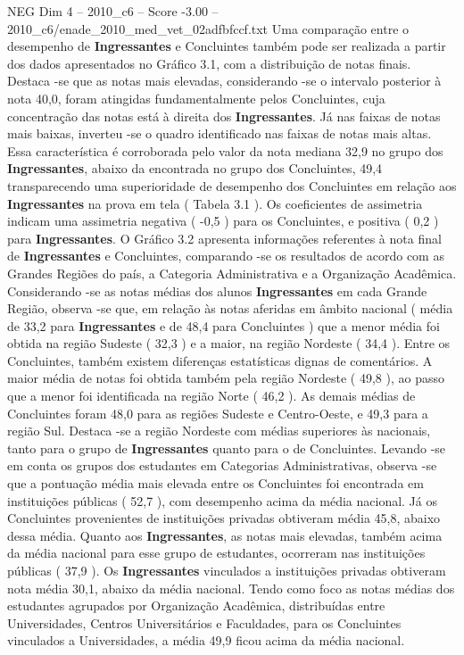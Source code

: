 \begin{textsample}{NEG Dim 4 – 2010\_c6 – Score -3.00 – 2010\_c6/enade\_2010\_med\_vet\_02adfbfccf.txt}
Uma comparação entre o desempenho de \textbf{Ingressantes} e Concluintes também pode ser realizada a partir dos dados apresentados no Gráfico 3.1, com a distribuição de notas finais.
Destaca -se que as notas mais elevadas, considerando -se o intervalo posterior à nota 40,0, foram atingidas fundamentalmente pelos Concluintes, cuja concentração das notas está à direita dos \textbf{Ingressantes}.
Já nas faixas de notas mais baixas, inverteu -se o quadro identificado nas faixas de notas mais altas.
Essa característica é corroborada pelo valor da nota mediana 32,9 no grupo dos \textbf{Ingressantes}, abaixo da encontrada no grupo dos Concluintes, 49,4 transparecendo uma superioridade de desempenho dos Concluintes em relação aos \textbf{Ingressantes} na prova em tela ( Tabela 3.1 ).
Os coeficientes de assimetria indicam uma assimetria negativa ( -0,5 ) para os Concluintes, e positiva ( 0,2 ) para \textbf{Ingressantes}.
O Gráfico 3.2 apresenta informações referentes à nota final de \textbf{Ingressantes} e Concluintes, comparando -se os resultados de acordo com as Grandes Regiões do país, a Categoria Administrativa e a Organização Acadêmica.
Considerando -se as notas médias dos alunos \textbf{Ingressantes} em cada Grande Região, observa -se que, em relação às notas aferidas em âmbito nacional ( média de 33,2 para \textbf{Ingressantes} e de 48,4 para Concluintes ) que a menor média foi obtida na região Sudeste ( 32,3 ) e a maior, na região Nordeste ( 34,4 ).
Entre os Concluintes, também existem diferenças estatísticas dignas de comentários.
A maior média de notas foi obtida também pela região Nordeste ( 49,8 ), ao passo que a menor foi identificada na região Norte ( 46,2 ).
As demais médias de Concluintes foram 48,0 para as regiões Sudeste e Centro-Oeste, e 49,3 para a região Sul.
Destaca -se a região Nordeste com médias superiores às nacionais, tanto para o grupo de \textbf{Ingressantes} quanto para o de Concluintes.
Levando -se em conta os grupos dos estudantes em Categorias Administrativas, observa -se que a pontuação média mais elevada entre os Concluintes foi encontrada em instituições públicas ( 52,7 ), com desempenho acima da média nacional.
Já os Concluintes provenientes de instituições privadas obtiveram média 45,8, abaixo dessa média.
Quanto aos \textbf{Ingressantes}, as notas mais elevadas, também acima da média nacional para esse grupo de estudantes, ocorreram nas instituições públicas ( 37,9 ).
Os \textbf{Ingressantes} vinculados a instituições privadas obtiveram nota média 30,1, abaixo da média nacional.
Tendo como foco as notas médias dos estudantes agrupados por Organização Acadêmica, distribuídas entre Universidades, Centros Universitários e Faculdades, para os Concluintes vinculados a Universidades, a média 49,9 ficou acima da média nacional.

\end{textsample}
